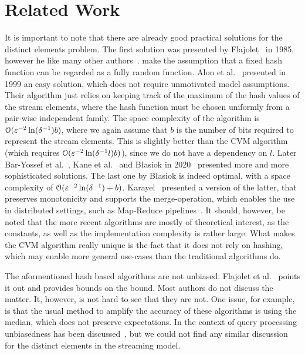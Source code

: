 \section{Related Work}\label{sec:related_work}
It is important to note that there are already good practical solutions for the distinct elements problem.
The first solution was presented by Flajolet~\cite{flajolet1985} in 1985, however he like many other authors~\cite{flajolet2007,heule2013,pettie2021}. make the assumption that a fixed hash function can be regarded as a fully random function.
Alon et al.~\cite[Section 2.3]{alon1999} presented in 1999 an easy solution, which does not require unmotivated model assumptions.
Their algorithm just relies on keeping track of the maximum of the hash values of the stream elements, where the hash function must be chosen uniformly from a pair-wise independent family.
The space complexity of the algorithm is $\operatorname{\mathcal O}(\varepsilon^{-2} \ln (\delta^{-1}) b)$, where we again assume that $b$ is the number of bits required to represent the stream elements.
This is slightly better than the CVM algorithm (which requires $\operatorname{\mathcal O}(\varepsilon^{-2} \ln (\delta^{-1}l) b)$), since we do not have a dependency on $l$.
Later Bar-Yossef et al.~\cite{baryossef2002}, Kane et al.~\cite{kane2010} and B\l{}asiok in 2020~\cite{blasiok2020} presented more and more sophisticated solutions.
The last one by B\l{}asiok is indeed optimal, with a space complexity of $\operatorname{\mathcal O}(\varepsilon^{-2} \ln (\delta^{-1}) + b)$.
Karayel~\cite{karayel2023} presented a version of the latter, that preserves monotonicity and supports the merge-operation, which enables the use in distributed settings, such as Map-Reduce pipelines~\cite{dean2010}.
It should, however, be noted that the more recent algorithms are mostly of theoretical interest, as the constants, as well as the implementation complexity is rather large.
What makes the CVM algorithm really unique is the fact that it does not rely on hashing, which may enable more general use-cases than the traditional algorithms do.

The aformentioned hash based algorithms are not unbiased.
Flajolet et al.~\cite{flajolet1985} points it out and provides bounds on the bound.
Most authors do not discuss the matter.
It, however, is not hard to see that they are not.
One issue, for example, is that the usual method to amplify the accuracy of these algorithms is using the median, which does not preserve expectations.
In the context of query processing unbiasedness has been discussed~\cite[Section 2.1]{haas1995}, but we could not find any similar discussion for the distinct elements in the streaming model.

